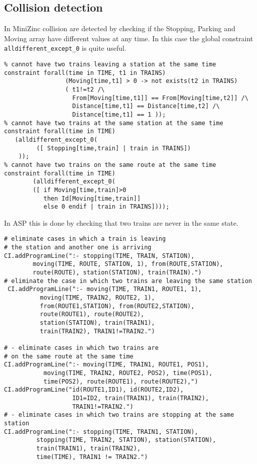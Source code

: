 \documentclass[11pt]{article}
\begin{document}
\subsection{Collision detection}
In MiniZinc collision are detected by checking if the Stopping, Parking and Moving
array have different values at any time. In this case the global constraint 
\verb+alldifferent_except_0+ is quite useful.
\begin{verbatim}
% cannot have two trains leaving a station at the same time
constraint forall(time in TIME, t1 in TRAINS)
                 (Moving[time,t1] > 0 -> not exists(t2 in TRAINS)
                 ( t1!=t2 /\ 
                   From[Moving[time,t1]] == From[Moving[time,t2]] /\
                   Distance[time,t1] == Distance[time,t2] /\
                   Distance[time,t1] == 1 ));
% cannot have two trains at the same station at the same time 
constraint forall(time in TIME)
   (alldifferent_except_0(
         ([ Stopping[time,train] | train in TRAINS])
    ));
% cannot have two trains on the same route at the same time
constraint forall(time in TIME)
        (alldifferent_except_0(
        ([ if Moving[time,train]>0 
           then Id[Moving[time,train]] 
           else 0 endif | train in TRAINS])));
\end{verbatim}
In ASP this is done by checking that two trains are never in the same state.
\begin{verbatim}
# eliminate cases in which a train is leaving 
# the station and another one is arriving 
CI.addProgramLine(":- stopping(TIME, TRAIN, STATION), 
        moving(TIME, ROUTE, STATION, 1), from(ROUTE,STATION),
        route(ROUTE), station(STATION), train(TRAIN).")
# eliminate the case in which two trains are leaving the same station
 CI.addProgramLine(":- moving(TIME, TRAIN1, ROUTE1, 1),
          moving(TIME, TRAIN2, ROUTE2, 1), 
          from(ROUTE1,STATION), from(ROUTE2,STATION),
          route(ROUTE1), route(ROUTE2),
          station(STATION), train(TRAIN1),
          train(TRAIN2), TRAIN1!=TRAIN2.")
        
# - eliminate cases in which two trains are 
# on the same route at the same time
CI.addProgramLine(":- moving(TIME, TRAIN1, ROUTE1, POS1),
           moving(TIME, TRAIN2, ROUTE2, POS2), time(POS1),
           time(POS2), route(ROUTE1), route(ROUTE2),")
CI.addProgramLine("id(ROUTE1,ID1), id(ROUTE2,ID2),
                   ID1=ID2, train(TRAIN1), train(TRAIN2),
                   TRAIN1!=TRAIN2.")
# - eliminate cases in which two trains are stopping at the same station
CI.addProgramLine(":- stopping(TIME, TRAIN1, STATION),
         stopping(TIME, TRAIN2, STATION), station(STATION),
         train(TRAIN1), train(TRAIN2), 
         time(TIME), TRAIN1 != TRAIN2.")
    
\end{verbatim}
\end{document}
